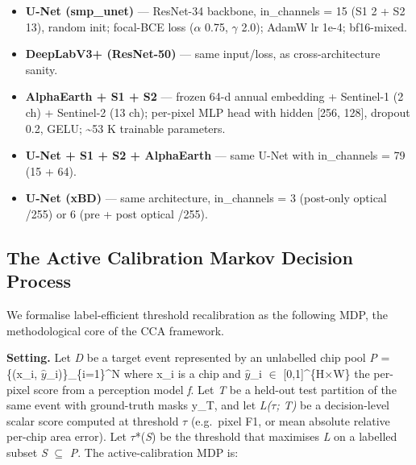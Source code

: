 \begin{itemize}
\tightlist
\item
  \textbf{U-Net (smp\_unet)} --- ResNet-34 backbone, in\_channels = 15 (S1 2 + S2 13),
  random init; focal-BCE loss ($\alpha$ 0.75, $\gamma$ 2.0); AdamW lr 1e-4; bf16-mixed.
\item
  \textbf{DeepLabV3+ (ResNet-50)} --- same input/loss, as cross-architecture sanity.
\item
  \textbf{AlphaEarth + S1 + S2} --- frozen 64-d annual embedding + Sentinel-1 (2 ch) +
  Sentinel-2 (13 ch); per-pixel MLP head with hidden {[}256, 128{]}, dropout 0.2,
  GELU; \textasciitilde53 K trainable parameters.
\item
  \textbf{U-Net + S1 + S2 + AlphaEarth} --- same U-Net with in\_channels = 79 (15 + 64).
\item
  \textbf{U-Net (xBD)} --- same architecture, in\_channels = 3 (post-only optical /255)
  or 6 (pre + post optical /255).
\end{itemize}

\subsection{The Active Calibration Markov Decision Process}\label{the-active-calibration-markov-decision-process}

We formalise label-efficient threshold recalibration as the following MDP,
the methodological core of the CCA framework.

\textbf{Setting.} Let \emph{D} be a target event represented by an unlabelled chip pool
\emph{P} = \{(x\_i, \(\hat{y}\)\_i)\}\_\{i=1\}\^{}N where x\_i is a chip and \(\hat{y}\)\_i $\in$ {[}0,1{]}\^{}\{H$\times$W\} the
per-pixel score from a perception model \emph{f}. Let \emph{T} be a held-out test
partition of the same event with ground-truth masks y\_T, and let \emph{L($\tau$; T)} be
a decision-level scalar score computed at threshold $\tau$ (e.g.~pixel F1, or
mean absolute relative per-chip area error). Let \emph{$\tau$}*(\emph{S}) be the threshold
that maximises \emph{L} on a labelled subset \emph{S} $\subseteq$ \emph{P}. The active-calibration
MDP is:

